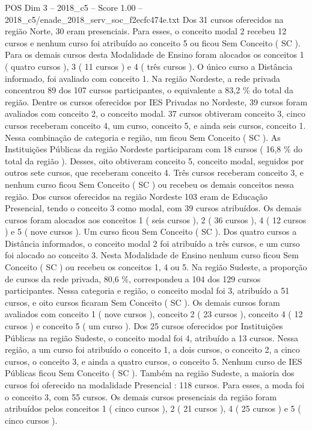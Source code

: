 \begin{textsample}{POS Dim 3 – 2018\_c5 – Score 1.00 – 2018\_c5/enade\_2018\_serv\_soc\_f2ecfc474e.txt}
Dos 31 cursos oferecidos na região Norte, 30 eram presenciais.
Para esses, o conceito modal 2 recebeu 12 cursos e nenhum curso foi atribuído ao conceito 5 ou ficou Sem Conceito ( SC ).
Para os demais cursos desta Modalidade de Ensino foram alocados os conceitos 1 ( quatro cursos ), 3 ( 11 cursos ) e 4 ( três cursos ).
O único curso a Distância informado, foi avaliado com conceito 1.
Na região Nordeste, a rede privada concentrou 89 dos 107 cursos participantes, o equivalente a 83,2 \% do total da região.
Dentre os cursos oferecidos por IES Privadas no Nordeste, 39 cursos foram avaliados com conceito 2, o conceito modal. 37 cursos obtiveram conceito 3, cinco cursos receberam conceito 4, um curso, conceito 5, e ainda seis cursos, conceito 1.
Nessa combinação de categoria e região, um ficou Sem Conceito ( SC ).
As Instituições Públicas da região Nordeste participaram com 18 cursos ( 16,8 \% do total da região ).
Desses, oito obtiveram conceito 5, conceito modal, seguidos por outros sete cursos, que receberam conceito 4.
Três cursos receberam conceito 3, e nenhum curso ficou Sem Conceito ( SC ) ou recebeu os demais conceitos nessa região.
Dos cursos oferecidos na região Nordeste 103 eram de Educação Presencial, tendo o conceito 3 como modal, com 39 cursos atribuídos.
Os demais cursos foram alocados aos conceitos 1 ( seis cursos ), 2 ( 36 cursos ), 4 ( 12 cursos ) e 5 ( nove cursos ).
Um curso ficou Sem Conceito ( SC ).
Dos quatro cursos a Distância informados, o conceito modal 2 foi atribuído a três cursos, e um curso foi alocado ao conceito 3.
Nesta Modalidade de Ensino nenhum curso ficou Sem Conceito ( SC ) ou recebeu os conceitos 1, 4 ou 5.
Na região Sudeste, a proporção de cursos da rede privada, 80,6 \%, correspondeu a 104 dos 129 cursos participantes.
Nessa categoria e região, o conceito modal foi 3, atribuído a 51 cursos, e oito cursos ficaram Sem Conceito ( SC ).
Os demais cursos foram avaliados com conceito 1 ( nove cursos ), conceito 2 ( 23 cursos ), conceito 4 ( 12 cursos ) e conceito 5 ( um curso ).
Dos 25 cursos oferecidos por Instituições Públicas na região Sudeste, o conceito modal foi 4, atribuído a 13 cursos.
Nessa região, a um curso foi atribuído o conceito 1, a dois cursos, o conceito 2, a cinco cursos, o conceito 3, e ainda a quatro cursos, o conceito 5.
Nenhum curso de IES Públicas ficou Sem Conceito ( SC ).
Também na região Sudeste, a maioria dos cursos foi oferecido na modalidade Presencial : 118 cursos.
Para esses, a moda foi o conceito 3, com 55 cursos.
Os demais cursos presenciais da região foram atribuídos pelos conceitos 1 ( cinco cursos ), 2 ( 21 cursos ), 4 ( 25 cursos ) e 5 ( cinco cursos ).

\end{textsample}
